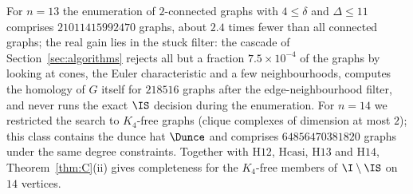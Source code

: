 For $n=13$ the enumeration of $2$-connected graphs with $4\le\delta$ and $\Delta\le 11$ comprises $\num{21011415992470}$ graphs, about $2.4$ times fewer than all connected graphs; the real gain lies in the stuck filter: the cascade of Section~\ref{sec:algorithms} rejects all but a fraction $7.5\times10^{-4}$ of the graphs by looking at cones, the Euler characteristic and a few neighbourhoods, computes the homology of $G$ itself for $\num{218516}$ graphs after the edge-neighbourhood filter, and never runs the exact $\IS$ decision during the enumeration. For $n=14$ we restricted the search to $K_4$-free graphs (clique complexes of dimension at most $2$); this class contains the dunce hat $\Dunce$ and comprises $\num{64856470381820}$ graphs under the same degree constraints. Together with $\mathrm{H12}$, $\mathrm{Hcasi}$, $\mathrm{H13}$ and $\mathrm{H14}$, Theorem~\ref{thm:C}(ii) gives completeness for the $K_4$-free members of $\I\setminus\IS$ on $14$ vertices.
